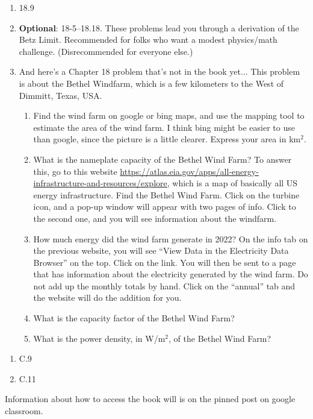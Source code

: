 \documentclass[12pt]{article}
\begin{document}
\begin{enumerate}
\setlength{\itemsep}{-1mm}
\item 18.9
\item {\bf Optional}: 18-5--18.18. These problems lead you through a
  derivation of the Betz Limit. Recommended for folks who want a
  modest physics/math challenge. (Disrecommended for everyone
  else.)
  \item And here's a Chapter 18 problem that's not in the book
    yet... This problem is about the Bethel Windfarm, which is a few
    kilometers to the West of Dimmitt, Texas, USA.
    \begin{enumerate}
      \item Find the wind farm on google or bing maps, and use the
        mapping tool to estimate the area of the wind farm. I think
        bing might be easier to use than google, since the picture is
        a little clearer. Express your area in km$^2$.
        \item What is the nameplate capacity of the Bethel Wind Farm?
          To answer this, go to this website
          \url{https://atlas.eia.gov/apps/all-energy-infrastructure-and-resources/explore},
          which is a map of basically all US energy infrastructure.
          Find the Bethel Wind Farm.  Click on the turbine icon, and
          a pop-up window will appear with two pages of info. Click to
          the second one, and you will see information about the
          windfarm.
      \item How much energy did the wind farm generate in 2022? On the
        info tab on the previous website, you will see ``View Data in
        the Electricity Data Browser'' on the top.  Click on the
        link.  You will then be sent to a page that has information
        about the electricity generated by the wind farm. 
        Do not add up the monthly totals by hand. Click on the
        ``annual'' tab and the website will do the addition for you.
      \item What is the capacity factor of the Bethel Wind Farm?
      \item What is the power density, in W/m$^2$, of the Bethel
        Wind Farm? \\
    \end{enumerate}
    \end{enumerate}


\begin{enumerate}
  \setlength{\itemsep}{-1mm}
\item C.9
\item C.11\\ 
\end{enumerate}


\noindent Information about how to access the book will is on the
pinned post on google classroom. 
\end{document}
